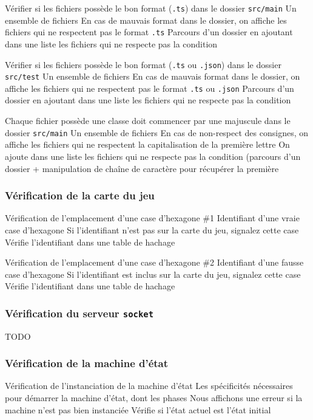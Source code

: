 \mytest
{Vérifier si les fichiers possède le bon format (\texttt{.ts}) dans le dossier \texttt{src/main}}
{Un ensemble de fichiers}
{En cas de mauvais format dans le dossier, on affiche les fichiers qui ne respectent pas le format \texttt{.ts}}
{Parcours d'un dossier en ajoutant dans une liste les fichiers qui ne respecte pas la condition}

\mytest
{Vérifier si les fichiers possède le bon format (\texttt{.ts} ou \texttt{.json}) dans le dossier \texttt{src/test}}
{Un ensemble de fichiers}
{En cas de mauvais format dans le dossier, on affiche les fichiers qui ne respectent pas le format \texttt{.ts} ou \texttt{.json}}
{Parcours d'un dossier en ajoutant dans une liste les fichiers qui ne respecte pas la condition}

\mytest
{Chaque fichier possède une classe doit commencer par une majuscule dans le dossier \texttt{src/main}}
{Un ensemble de fichiers}
{En cas de non-respect des consignes, on affiche les fichiers qui ne respectent la capitalisation de la première lettre}
{On ajoute dans une liste les fichiers qui ne respecte pas la condition (parcours d'un dossier + manipulation de chaîne de caractère pour récupérer la première}

\subsubsection{Vérification de la carte du jeu}

\mytest
{Vérification de l'emplacement d'une case d'hexagone \#1}
{Identifiant d'une vraie case d'hexagone}
{Si l'identifiant n'est pas sur la carte du jeu, signalez cette case}
{Vérifie l'identifiant dans une table de hachage}

\mytest
{Vérification de l'emplacement d'une case d'hexagone \#2}
{Identifiant d'une fausse case d'hexagone}
{Si l'identifiant est inclus sur la carte du jeu, signalez cette case}
{Vérifie l'identifiant dans une table de hachage}

\subsubsection{Vérification du serveur {\tt socket}}

TODO

\subsubsection{Vérification de la machine d'état}
\mytest
{Vérification de l'instanciation de la machine d'état}
{Les spécificités nécessaires pour démarrer la machine d'état, dont les phases}
{Nous affichons une erreur si la machine n'est pas bien instanciée}
{Vérifie si l'état actuel est l'état initial}

